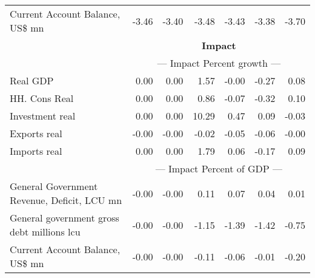 \documentclass{article}
\begin{document}
\begin{table}[ht]
\begin{tabular}{lrrrrr|r}
Current Account Balance, US\$ mn & -3.46 & -3.40 & -3.48 & -3.43 & -3.38 & -3.70 \\
&\multicolumn{6}{c}{{\large \textbf{Impact}}}                               \\
&\multicolumn{6}{c}{{--- Impact Percent growth ---}}                               \\
Real GDP & 0.00 & 0.00 & 1.57 & -0.00 & -0.27 & 0.08 \\
HH. Cons Real & 0.00 & 0.00 & 0.86 & -0.07 & -0.32 & 0.10 \\
Investment real & 0.00 & 0.00 & 10.29 & 0.47 & 0.09 & -0.03 \\
Exports real & -0.00 & -0.00 & -0.02 & -0.05 & -0.06 & -0.00 \\
Imports real & 0.00 & 0.00 & 1.79 & 0.06 & -0.17 & 0.09 \\
&\multicolumn{6}{c}{{--- Impact Percent of GDP ---}}                               \\
General Government Revenue, Deficit, LCU mn & -0.00 & -0.00 & 0.11 & 0.07 & 0.04 & 0.01 \\
General government gross debt millions lcu & -0.00 & -0.00 & -1.15 & -1.39 & -1.42 & -0.75 \\
Current Account Balance, US\$ mn & -0.00 & -0.00 & -0.11 & -0.06 & -0.01 & -0.20 \\
\bottomrule
\end{tabular}
\end{table}
\end{document}

